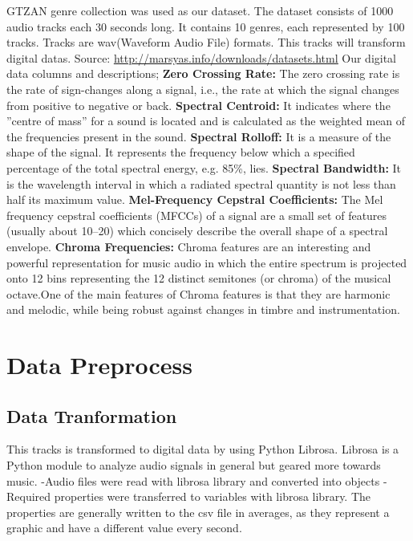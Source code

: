 \documentclass{article}
\begin{document}
GTZAN genre collection was used as our dataset. The dataset consists of 1000 audio tracks each 30 seconds long. It contains 10 genres, each represented by 100 tracks. Tracks are wav(Waveform Audio File) formats. This tracks will transform digital datas. \newline
Source: \underline{\url{http://marsyas.info/downloads/datasets.html}} \newline
\newline
Our digital data columns and descriptions;\newline
\textbf{Zero Crossing Rate: } The zero crossing rate is the rate of sign-changes along a signal, i.e., the rate at which the signal changes from positive to negative or back. \newline
\textbf{Spectral Centroid: } It indicates where the ”centre of mass” for a sound is located and is calculated as the weighted mean of the frequencies present in the sound.\newline
\textbf{Spectral Rolloff:} It is a measure of the shape of the signal. It represents the frequency below which a specified percentage of the total spectral energy, e.g. 85\%, lies. \newline
\textbf{Spectral Bandwidth: } It is the wavelength interval in which a radiated spectral quantity is not less than half its maximum value.\newline
\textbf{Mel-Frequency Cepstral Coefficients: } The Mel frequency cepstral coefficients (MFCCs) of a signal are a small set of features (usually about 10–20) which concisely describe the overall shape of a spectral envelope.\newline
\textbf{Chroma Frequencies:} Chroma features are an interesting and powerful representation for music audio in which the entire spectrum is projected onto 12 bins representing the 12 distinct semitones (or chroma) of the musical octave.One of the main features of Chroma features is that they are harmonic and melodic, while being robust against changes in timbre and instrumentation.\newline

\section{ Data Preprocess}

\subsection{Data Tranformation }
This tracks is transformed to digital data by using Python Librosa. Librosa is a Python module to analyze audio signals in general but geared more towards music. 
-Audio files were read with librosa library and converted into objects
-Required properties were transferred to variables with librosa library. The properties are generally written to the csv file in averages, as they represent a graphic and have a different value every second. \
\end{document}
